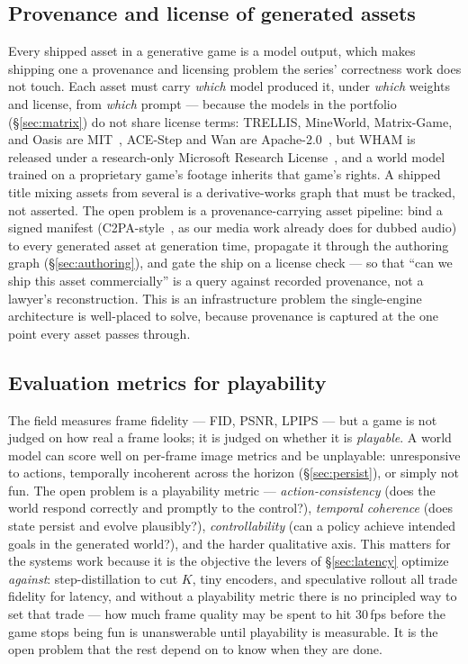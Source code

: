 \documentclass[11pt]{article}
\newcommand{\fps}[1]{\mbox{#1\,fps}}
\begin{document}
\subsection{Provenance and license of generated assets}
\label{sec:provenance}

Every shipped asset in a generative game is a model output, which makes shipping one a provenance and licensing
problem the series' correctness work does not touch. Each asset must carry \emph{which} model produced it,
under \emph{which} weights and license, from \emph{which} prompt --- because the models in the portfolio
(\S\ref{sec:matrix}) do not share license terms: TRELLIS, MineWorld, Matrix-Game, and Oasis are
MIT~\cite{trellis,mineworld,matrixgame,oasis}, ACE-Step and Wan are Apache-2.0~\cite{acestep,wan}, but WHAM is
released under a research-only Microsoft Research License~\cite{wham}, and a world model trained on a
proprietary game's footage inherits that game's rights. A shipped title mixing assets from several is a
derivative-works graph that must be tracked, not asserted. The open problem is a provenance-carrying asset
pipeline: bind a signed manifest (C2PA-style~\cite{c2pa}, as our media work already does for dubbed audio) to
every generated asset at generation time, propagate it through the authoring graph (\S\ref{sec:authoring}), and
gate the ship on a license check --- so that ``can we ship this asset commercially'' is a query against
recorded provenance, not a lawyer's reconstruction. This is an infrastructure problem the single-engine
architecture is well-placed to solve, because provenance is captured at the one point every asset passes
through.

\subsection{Evaluation metrics for playability}
\label{sec:eval}

The field measures frame fidelity --- FID, PSNR, LPIPS --- but a game is not judged on how real a frame looks;
it is judged on whether it is \emph{playable}. A world model can score well on per-frame image metrics and be
unplayable: unresponsive to actions, temporally incoherent across the horizon (\S\ref{sec:persist}), or simply
not fun. The open problem is a playability metric --- \emph{action-consistency} (does the world respond
correctly and promptly to the control?), \emph{temporal coherence} (does state persist and evolve
plausibly?), \emph{controllability} (can a policy achieve intended goals in the generated world?), and the
harder qualitative axis. This matters for the systems work because it is the objective the levers of
\S\ref{sec:latency} optimize \emph{against}: step-distillation to cut $K$, tiny encoders, and speculative
rollout all trade fidelity for latency, and without a playability metric there is no principled way to set that
trade --- how much frame quality may be spent to hit \fps{30} before the game stops being fun is unanswerable
until playability is measurable. It is the open problem that the rest depend on to know when they are done.
\end{document}
